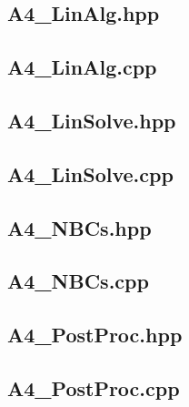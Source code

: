 \documentclass[a4paper, 12pt]{article}
\begin{document}
\newpage
\subsection{A4\_LinAlg.hpp} \label{subsec:LinAlg.hpp}


\newpage
\subsection{A4\_LinAlg.cpp} \label{subsec:LinAlg.cpp}


\newpage
\subsection{A4\_LinSolve.hpp} \label{subsec:LinSolve.hpp}


\newpage
\subsection{A4\_LinSolve.cpp} \label{subsec:LinSolve.cpp}


\newpage
\subsection{A4\_NBCs.hpp} \label{subsec:NBCs.hpp}


\newpage
\subsection{A4\_NBCs.cpp} \label{subsec:NBCs.cpp}


\newpage
\subsection{A4\_PostProc.hpp} \label{subsec:PostProc.hpp}


\newpage
\subsection{A4\_PostProc.cpp} \label{subsec:PostProc.cpp}

\end{document}
